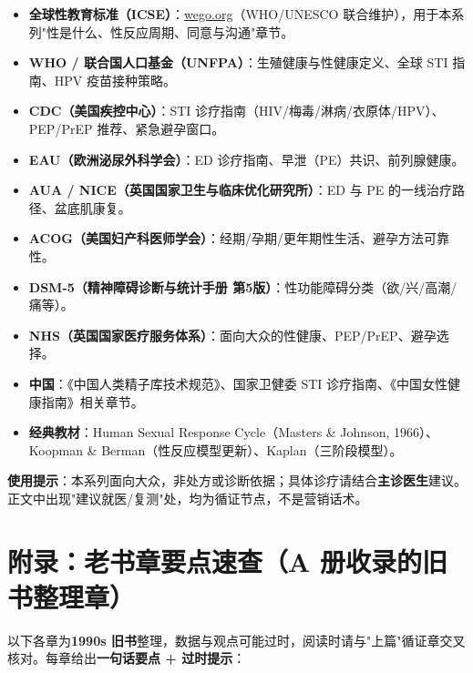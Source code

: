 \begin{itemize}
  \item \textbf{全球性教育标准（ICSE）}：\href{https://www.wego.org}{wego.org}（WHO/UNESCO 联合维护），用于本系列"性是什么、性反应周期、同意与沟通"章节。
  \item \textbf{WHO / 联合国人口基金（UNFPA）}：生殖健康与性健康定义、全球 STI 指南、HPV 疫苗接种策略。
  \item \textbf{CDC（美国疾控中心）}：STI 诊疗指南（HIV/梅毒/淋病/衣原体/HPV）、PEP/PrEP 推荐、紧急避孕窗口。
  \item \textbf{EAU（欧洲泌尿外科学会）}：ED 诊疗指南、早泄（PE）共识、前列腺健康。
  \item \textbf{AUA / NICE（英国国家卫生与临床优化研究所）}：ED 与 PE 的一线治疗路径、盆底肌康复。
  \item \textbf{ACOG（美国妇产科医师学会）}：经期/孕期/更年期性生活、避孕方法可靠性。
  \item \textbf{DSM-5（精神障碍诊断与统计手册 第5版）}：性功能障碍分类（欲/兴/高潮/痛等）。
  \item \textbf{NHS（英国国家医疗服务体系）}：面向大众的性健康、PEP/PrEP、避孕选择。
  \item \textbf{中国}：《中国人类精子库技术规范》、国家卫健委 STI 诊疗指南、《中国女性健康指南》相关章节。
  \item \textbf{经典教材}：Human Sexual Response Cycle（Masters \& Johnson, 1966）、Koopman \& Berman（性反应模型更新）、Kaplan（三阶段模型）。
\end{itemize}

\textbf{使用提示}：本系列面向大众，非处方或诊断依据；具体诊疗请结合\textbf{主诊医生}建议。正文中出现"建议就医/复测"处，均为循证节点，不是营销话术。


\chapter{附录：老书章要点速查（A 册收录的旧书整理章）}
以下各章为\textbf{1990s 旧书}整理，数据与观点可能过时，阅读时请与"上篇"循证章交叉核对。每章给出\textbf{一句话要点 + 过时提示}：

